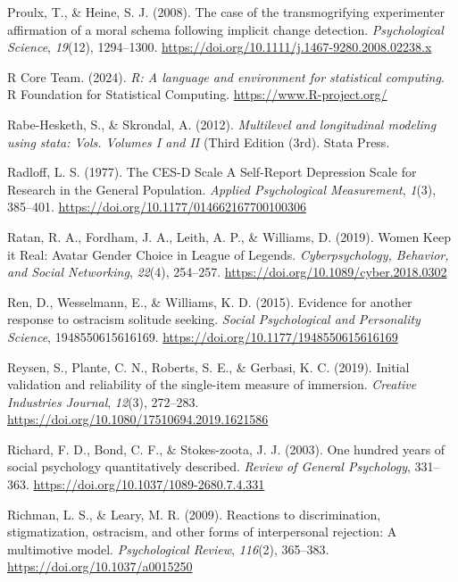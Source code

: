 \documentclass[
]{udthesis}
\newlength{\cslhangindent}
\newenvironment{CSLReferences}[2] %
 {\begin{list}{}{%
  \setlength{\itemindent}{0pt}
  \setlength{\leftmargin}{0pt}
  \setlength{\parsep}{0pt}
  \ifodd #1
   \setlength{\leftmargin}{\cslhangindent}
   \setlength{\itemindent}{-1\cslhangindent}
  \fi
  \setlength{\itemsep}{#2\baselineskip}}}
 {\end{list}}
\begin{document}
\begin{CSLReferences}{1}{0}
Proulx, T., \& Heine, S. J. (2008). The case of the transmogrifying experimenter affirmation of a moral schema following implicit change detection. \emph{Psychological Science}, \emph{19}(12), 1294--1300. \url{https://doi.org/10.1111/j.1467-9280.2008.02238.x}

R Core Team. (2024). \emph{R: A language and environment for statistical computing}. R Foundation for Statistical Computing. \url{https://www.R-project.org/}

Rabe-Hesketh, S., \& Skrondal, A. (2012). \emph{Multilevel and longitudinal modeling using stata: Vols. Volumes I and II} (Third Edition (3rd). {Stata Press}.

Radloff, L. S. (1977). The {CES}-{D Scale A Self}-{Report Depression Scale} for {Research} in the {General Population}. \emph{Applied Psychological Measurement}, \emph{1}(3), 385--401. \url{https://doi.org/10.1177/014662167700100306}

Ratan, R. A., Fordham, J. A., Leith, A. P., \& Williams, D. (2019). Women {Keep} it {Real}: {Avatar Gender Choice} in {League} of {Legends}. \emph{Cyberpsychology, Behavior, and Social Networking}, \emph{22}(4), 254--257. \url{https://doi.org/10.1089/cyber.2018.0302}

Ren, D., Wesselmann, E., \& Williams, K. D. (2015). Evidence for another response to ostracism solitude seeking. \emph{Social Psychological and Personality Science}, 1948550615616169. \url{https://doi.org/10.1177/1948550615616169}

Reysen, S., Plante, C. N., Roberts, S. E., \& Gerbasi, K. C. (2019). Initial validation and reliability of the single-item measure of immersion. \emph{Creative Industries Journal}, \emph{12}(3), 272--283. \url{https://doi.org/10.1080/17510694.2019.1621586}

Richard, F. D., Bond, C. F., \& Stokes-zoota, J. J. (2003). One hundred years of social psychology quantitatively described. \emph{Review of General Psychology}, 331--363. \url{https://doi.org/10.1037/1089-2680.7.4.331}

Richman, L. S., \& Leary, M. R. (2009). Reactions to discrimination, stigmatization, ostracism, and other forms of interpersonal rejection: {A} multimotive model. \emph{Psychological Review}, \emph{116}(2), 365--383. \url{https://doi.org/10.1037/a0015250}


\end{CSLReferences}
\end{document}
